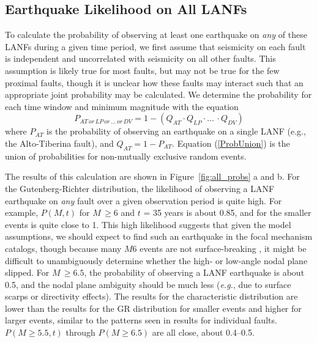 \documentclass[twocolumn,grl]{AGUTeX}
\begin{document}
\begin{article}
\subsection{Earthquake Likelihood on All LANFs}
To calculate the probability of observing at least one earthquake on \emph{any}
of these LANFs during a given time period, we first assume that seismicity on
each fault is independent and uncorrelated with seismicity on all other faults.
This assumption is likely true for most faults, but may not be true for the few
proximal faults, though it is unclear how these faults may interact such that
an appropriate joint probability may be calculated.  We determine the
probability for each time window and minimum magnitude with the equation
\begin{equation}
P_{AT \, or \, LP\, or\, \ldots \, or \, DV} = 1 - (Q_{AT} \cdot Q_{LP} \cdot \ldots \, \cdot Q_{DV})
\label{ProbUnion}
\end{equation}
where $P_{AT}$ is the probability of observing an earthquake on a single LANF
(e.g., the Alto-Tiberina fault), and $Q_{AT} = 1 - P_{AT}$. Equation
(\ref{ProbUnion}) is the union of probabilities for non-mutually exclusive
random events.

The results of this calculation are shown in Figure~\ref{fig:all_probs} a and b.
For the Gutenberg-Richter distribution, the likelihood of observing a LANF
earthquake on \emph{any} fault over a given observation period is quite high.
For example, $P(M,t)$ for $M \, \ge 6$ and $t$ = 35 years is about 0.85, and
for the smaller events is quite close to 1.  This high likelihood suggests that
given the model assumptions, we should expect to find such an earthquake in the
focal mechanism catalogs, though because many $M6$ events are not
surface-breaking \citep{hecker2013eqdist}, it might be difficult to
unambiguously determine whether the high- or low-angle nodal plane slipped.
For $M \, \ge 6.5$, the probability of observing a LANF earthquake is about
0.5, and the nodal plane ambiguity should be much less ({\it e.g.}, due to
surface scarps or directivity effects).  The results for the characteristic
distribution are lower than the results for the GR distribution for smaller
events and higher for larger events, similar to the patterns seen in results
for individual faults. $P(M\ge5.5,t)$ through $P(M\ge6.5)$ are all close, about
0.4--0.5.



\end{article}
\end{document}
